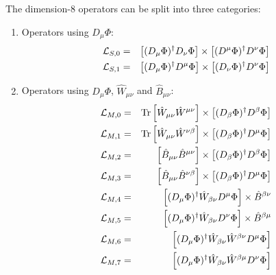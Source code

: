 \documentclass[english,12pt]{article}
\begin{document}
\vskip6pt
\noindent
The dimension-8 operators can be split into three categories:
\begin{enumerate}
 \item Operators using $D_\mu \Phi$:
  \begin{eqnarray}
   {\cal L}_{S,0} &=& \left[ (D_\mu \Phi)^\dagger D_\nu \Phi \right] \times 
      \left[ ( D^\mu \Phi)^\dagger D^\nu \Phi \right] \nonumber\\
   {\cal L}_{S,1} &=& \left[ ( D_\mu \Phi )^\dagger D^\mu \Phi  \right] \times 
      \left[ ( D_\nu \Phi )^\dagger D^\nu \Phi \right]
  \end{eqnarray}

 \item Operators using $D_\mu \Phi$, $\hat{W}_{\mu \nu}$ and $\hat{B}_{\mu \nu}$:
  \begin{eqnarray}
   {\cal L}_{M,0} &=& \hbox{Tr}\left[ \hat{W}_{\mu\nu} \hat{W}^{\mu\nu} \right] \times 
      \left[ ( D_\beta \Phi )^\dagger D^\beta \Phi \right] \nonumber\\
   {\cal L}_{M,1} &=& \hbox{Tr}\left[ \hat{W}_{\mu\nu} \hat{W}^{\nu\beta} \right] \times  
      \left[ ( D_\beta \Phi )^\dagger D^\mu \Phi \right] \nonumber\\
   {\cal L}_{M,2} &=& \left[ \hat{B}_{\mu\nu} \hat{B}^{\mu\nu} \right ] \times  
      \left [ ( D_\beta \Phi )^\dagger D^\beta \Phi \right ] \nonumber\\
   {\cal L}_{M,3} &=& \left[ \hat{B}_{\mu\nu} \hat{B}^{\nu\beta} \right ] \times  
      \left [ ( D_\beta \Phi )^\dagger D^\mu \Phi \right ] \nonumber\\
   {\cal L}_{M,4} &=& \left[ ( D_\mu \Phi )^\dagger \hat{W}_{\beta\nu} 
      D^\mu \Phi  \right] \times \hat{B}^{\beta\nu} \nonumber\\
   {\cal L}_{M,5} &=& \left[ ( D_\mu \Phi )^\dagger \hat{W}_{\beta\nu} 
      D^\nu \Phi  \right] \times \hat{B}^{\beta\mu} \nonumber\\
   {\cal L}_{M,6} &=& \left[ ( D_\mu \Phi )^\dagger \hat{W}_{\beta\nu} 
      \hat{W}^{\beta\nu} D^\mu \Phi \right] \nonumber\\
   {\cal L}_{M,7} &=& \left[ ( D_\mu \Phi )^\dagger \hat{W}_{\beta\nu} 
      \hat{W}^{\beta\mu} D^\nu \Phi  \right]
  \end{eqnarray}


\end{enumerate}
\end{document}
